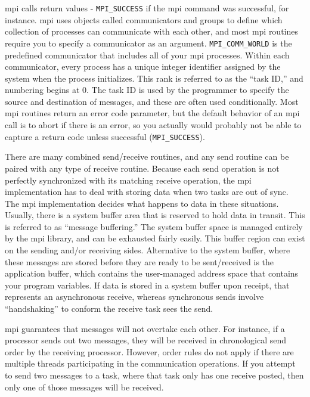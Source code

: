 \documentclass[10pt]{article}
\begin{document}
\begin{flushleft}
 \gls{mpi} calls return values - {\tt MPI\_SUCCESS} if the \gls{mpi} command was successful, for instance. \gls{mpi} uses objects called communicators and groups to define which collection of processes can communicate with each other, and most \gls{mpi} routines require you to specify a communicator as an argument. {\tt MPI\_COMM\_WORLD} is the predefined communicator that includes all of your \gls{mpi} processes. Within each communicator, every process has a unique integer identifier assigned by the system when the process initializes. This rank is referred to as the ``task ID,'' and numbering begins at 0. The task ID is used by the programmer to specify the source and destination of messages, and these are often used conditionally. Most \gls{mpi} routines return an error code parameter, but the default behavior of an \gls{mpi} call is to abort if there is an error, so you actually would probably not be able to capture a return code unless successful ({\tt MPI\_SUCCESS}). 

There are many combined send/receive routines, and any send routine can be paired with any type of receive routine. Because each send operation is not perfectly synchronized with its matching receive operation, the \gls{mpi} implementation has to deal with storing data when two tasks are out of sync. The \gls{mpi} implementation decides what happens to data in these situations. Usually, there is a system buffer area that is reserved to hold data in transit. This is referred to as ``message buffering.'' The system buffer space is managed entirely by the \gls{mpi} library, and can be exhausted fairly easily. This buffer region can exist on the sending and/or receiving sides. Alternative to the system buffer, where these messages are stored before they are ready to be sent/received is the application buffer, which contains the user-managed address space that contains your program variables. If data is stored in a system buffer upon receipt, that represents an asynchronous receive, whereas synchronous sends involve ``handshaking'' to conform the receive task sees the send.



\gls{mpi} guarantees that messages will not overtake each other. For instance, if a processor sends out two messages, they will be received in chronological send order by the receiving processor. However, order rules do not apply if there are multiple threads participating in the communication operations. If you attempt to send two messages to a task, where that task only has one receive posted, then only one of those messages will be received. 


\end{flushleft}
\end{document}
